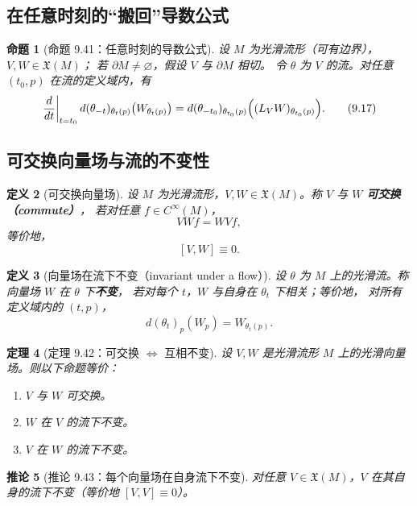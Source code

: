 \documentclass[11pt]{article}
\newtheorem{definition}{定义}[section]
\newtheorem{theorem}[definition]{定理}
\newtheorem{proposition}[definition]{命题}
\newtheorem{corollary}[definition]{推论}
\newcommand{\X}{\mathfrak{X}}
\begin{document}
\subsection{在任意时刻的“搬回”导数公式}

\begin{proposition}[命题 9.41：任意时刻的导数公式]
设 $M$ 为光滑流形（可有边界），$V,W\in\X(M)$；
若 $\partial M\neq\varnothing$，假设 $V$ 与 $\partial M$ 相切。
令 $\theta$ 为 $V$ 的流。对任意 $(t_0,p)$ 在流的定义域内，有
\[
\left.\frac{d}{dt}\right|_{t=t_0}
d(\theta_{-t})_{\theta_t(p)}\bigl(W_{\theta_t(p)}\bigr)
=
d(\theta_{-t_0})_{\theta_{t_0}(p)}
\Bigl((L_VW)_{\theta_{t_0}(p)}\Bigr).
\tag{9.17}
\]
\end{proposition}

\subsection{可交换向量场与流的不变性}

\begin{definition}[可交换向量场]
设 $M$ 为光滑流形，$V,W\in\X(M)$。称 $V$ 与 $W$ \textbf{可交换（commute）}，
若对任意 $f\in C^\infty(M)$，
\[
VWf=WVf,
\]
等价地，
\[
[V,W]\equiv 0.
\]
\end{definition}

\begin{definition}[向量场在流下不变（invariant under a flow）]
设 $\theta$ 为 $M$ 上的光滑流。称向量场 $W$ 在 $\theta$ 下\textbf{不变}，
若对每个 $t$，$W$ 与自身在 $\theta_t$ 下相关；等价地，
对所有定义域内的 $(t,p)$，
\[
d(\theta_t)_p(W_p)=W_{\theta_t(p)}.
\]
\end{definition}

\begin{theorem}[定理 9.42：可交换 $\Longleftrightarrow$ 互相不变]
设 $V,W$ 是光滑流形 $M$ 上的光滑向量场。则以下命题等价：
\begin{enumerate}[label=(\alph*)]
\item $V$ 与 $W$ 可交换。
\item $W$ 在 $V$ 的流下不变。
\item $V$ 在 $W$ 的流下不变。
\end{enumerate}
\end{theorem}

\begin{corollary}[推论 9.43：每个向量场在自身流下不变]
对任意 $V\in\X(M)$，$V$ 在其自身的流下不变（等价地 $[V,V]\equiv 0$）。
\end{corollary}
\end{document}
